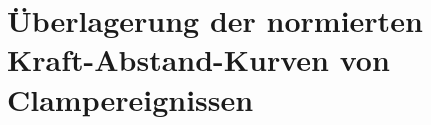 	\chapter{Überlagerung der normierten Kraft-Abstand-Kurven von Clampereignissen}
	\label{appendix:A}